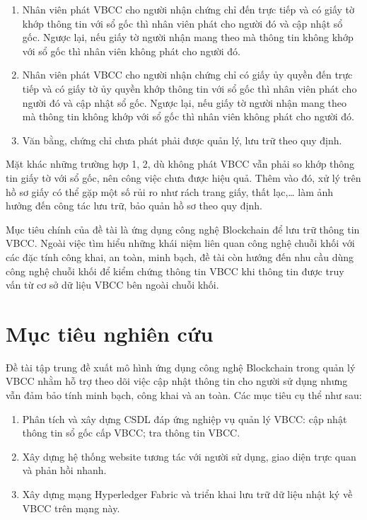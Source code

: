 \begin{enumerate}
\item Nhân viên phát VBCC cho người nhận chứng chỉ đến trực tiếp và có giấy tờ khớp thông tin với sổ gốc thì nhân viên phát cho người đó và cập nhật sổ gốc. Ngược lại, nếu giấy tờ người nhận mang theo mà thông tin không khớp với sổ gốc thì nhân viên không phát cho người đó.

\item Nhân viên phát VBCC cho người nhận chứng chỉ có giấy ủy quyền đến trực tiếp và có giấy tờ ủy quyền khớp thông tin với sổ gốc thì nhân viên phát cho người đó và cập nhật sổ gốc. Ngược lại, nếu giấy tờ người nhận mang theo mà thông tin không khớp với sổ gốc thì nhân viên không phát cho người đó.

\item Văn bằng, chứng chỉ chưa phát phải được quản lý, lưu trữ theo quy định.
\end{enumerate}

Mặt khác những trường hợp 1, 2, dù không phát VBCC vẫn phải so khớp thông tin giấy tờ với sổ gốc, nên công việc chưa được hiệu quả. Thêm vào đó, xử lý trên hồ sơ giấy có thể gặp một số rủi ro như rách trang giấy, thất lạc,\ldots{} làm ảnh hưởng đến công tác lưu trữ, bảo quản hồ sơ theo quy định.

Mục tiêu chính của đề tài là ứng dụng công nghệ Blockchain để lưu trữ thông tin VBCC. Ngoài việc tìm hiểu những khái niệm liên quan công nghệ chuỗi khối với các đặc tính công khai, an toàn, minh bạch, đề tài còn hướng đến nhu cầu dùng công nghệ chuỗi khối để kiểm chứng thông tin VBCC khi thông tin được truy vấn từ cơ sở dữ liệu VBCC bên ngoài chuỗi khối.

\section{Mục tiêu nghiên cứu}

Đề tài tập trung đề xuất mô hình ứng dụng công nghệ Blockchain trong quản lý VBCC nhằm hỗ trợ theo dõi việc cập nhật thông tin cho người sử dụng nhưng vẫn đảm bảo tính minh bạch, công khai và an toàn. Các mục tiêu cụ thể như sau:

\begin{enumerate}
\item Phân tích và xây dựng CSDL đáp ứng nghiệp vụ quản lý VBCC: cập nhật thông tin sổ gốc cấp VBCC; tra thông tin VBCC.
\item Xây dựng hệ thống website tương tác với người sử dụng, giao diện trực quan và phản hồi nhanh.
\item Xây dựng mạng Hyperledger Fabric và triển khai lưu trữ dữ liệu nhật ký về VBCC trên mạng này.
\end{enumerate}

